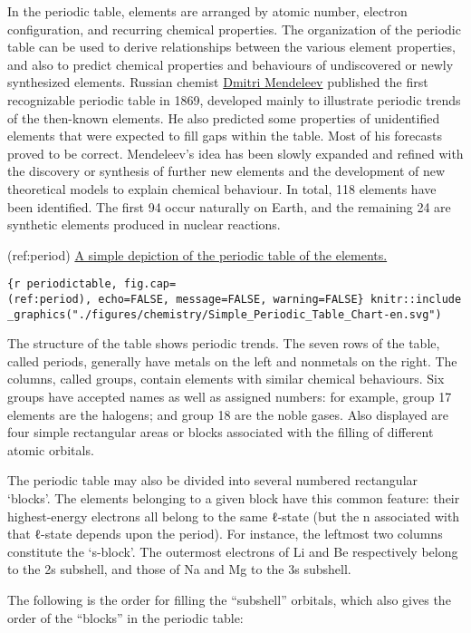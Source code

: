 \documentclass[
]{article}
\begin{document}
In the periodic table, elements are arranged by atomic number, electron
configuration, and recurring chemical properties. The organization of
the periodic table can be used to derive relationships between the
various element properties, and also to predict chemical properties and
behaviours of undiscovered or newly synthesized elements. Russian
chemist \href{https://en.wikipedia.org/wiki/Dmitri_Mendeleev}{Dmitri
Mendeleev} published the first recognizable periodic table in 1869,
developed mainly to illustrate periodic trends of the then-known
elements. He also predicted some properties of unidentified elements
that were expected to fill gaps within the table. Most of his forecasts
proved to be correct. Mendeleev's idea has been slowly expanded and
refined with the discovery or synthesis of further new elements and the
development of new theoretical models to explain chemical behaviour. In
total, 118 elements have been identified. The first 94 occur naturally
on Earth, and the remaining 24 are synthetic elements produced in
nuclear reactions.

(ref:period)
\href{https://commons.wikimedia.org/wiki/File:Simple_Periodic_Table_Chart-en.svg}{A
simple depiction of the periodic table of the elements.}

\texttt{\{r\ periodictable,\ fig.cap=\textquotesingle{}(ref:period)\textquotesingle{},\ echo=FALSE,\ message=FALSE,\ warning=FALSE\}\ knitr::include\_graphics("./figures/chemistry/Simple\_Periodic\_Table\_Chart-en.svg")}

The structure of the table shows periodic trends. The seven rows of the
table, called periods, generally have metals on the left and nonmetals
on the right. The columns, called groups, contain elements with similar
chemical behaviours. Six groups have accepted names as well as assigned
numbers: for example, group 17 elements are the halogens; and group 18
are the noble gases. Also displayed are four simple rectangular areas or
blocks associated with the filling of different atomic orbitals.

The periodic table may also be divided into several numbered rectangular
`blocks'. The elements belonging to a given block have this common
feature: their highest-energy electrons all belong to the same ℓ-state
(but the n associated with that ℓ-state depends upon the period). For
instance, the leftmost two columns constitute the `s-block'. The
outermost electrons of Li and Be respectively belong to the 2s subshell,
and those of Na and Mg to the 3s subshell.

The following is the order for filling the ``subshell'' orbitals, which
also gives the order of the ``blocks'' in the periodic table:
\end{document}
